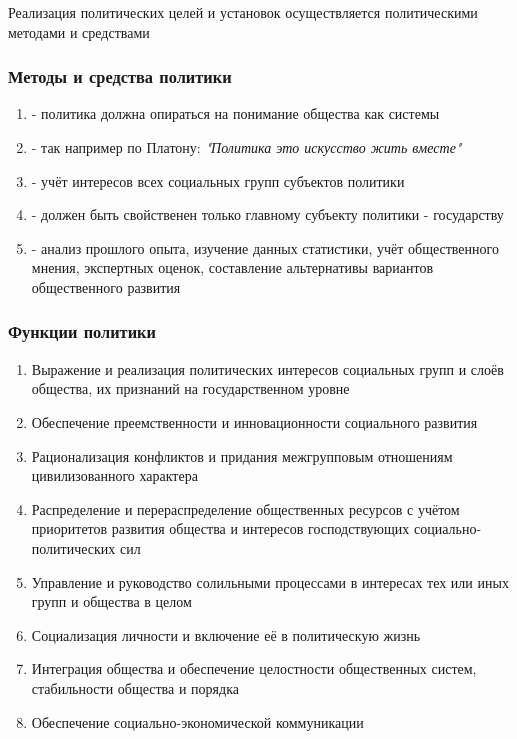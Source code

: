 Реализация политических целей и установок осуществляется политическими методами и
средствами

\subsubsection{Методы и средства политики}

\begin{enumerate}
  \item {} - политика должна опираться
        на понимание общества как системы
  \item {} - так например по Платону:
        \textit{"Политика это искусство жить вместе"}
  \item {} - учёт интересов всех социальных групп субъектов
        политики
  \item {} - должен быть свойственен только главному
        субъекту политики - государству
  \item {} - анализ прошлого опыта,
        изучение данных статистики, учёт общественного мнения, экспертных оценок,
        составление альтернативы вариантов общественного развития
\end{enumerate}

\subsubsection{Функции политики}

\begin{enumerate}
  \item Выражение и реализация политических интересов социальных групп и слоёв общества,
        их признаний на государственном уровне
  \item Обеспечение преемственности и инновационности социального развития
  \item Рационализация конфликтов и придания межгрупповым отношениям цивилизованного
        характера
  \item Распределение и перераспределение общественных ресурсов с учётом приоритетов
        развития общества и интересов господствующих социально-политических сил
  \item Управление и руководство солильными процессами в интересах тех или иных групп
        и общества в целом
  \item Социализация личности и включение её в политическую жизнь
  \item Интеграция общества и обеспечение целостности общественных систем, стабильности
        общества и порядка
  \item Обеспечение социально-экономической коммуникации
\end{enumerate}

